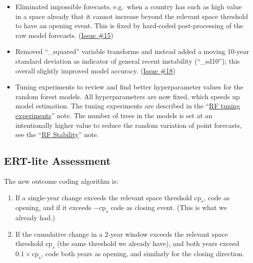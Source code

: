 \documentclass[
  11pt,
]{article}
\providecommand{\tightlist}{%
  \setlength{\itemsep}{0pt}\setlength{\parskip}{0pt}}
\begin{document}
\begin{itemize}
\tightlist
\item
  Eliminated impossible forecasts, e.g.~when a country has such as high
  value in a space already that it cannot increase beyond the relevant
  space threshold to have an opening event. This is fixed by hard-coded
  post-processing of the raw model forecasts.
  (\href{https://github.com/vdeminstitute/demspaces/issues/15}{Issue
  \#15})
\item
  Removed ``\_squared'' variable transforms and instead added a moving
  10-year standard deviation as indicator of general recent instability
  (``\_sd10''); this overall slightly improved model accuracy.
  (\href{https://github.com/vdeminstitute/demspaces/issues/18}{Issue
  \#18})
\item
  Tuning experiments to review and find better hyperparameter values for
  the random forest models. All hyperparameters are now fixed, which
  speeds up model estimation. The tuning experiments are described in
  the
  ``\href{https://github.com/vdeminstitute/demspaces/blob/main/2022-update/tuning-experiments.md}{RF
  tuning experiments}'' note. The number of trees in the models is set
  at an intentionally higher value to reduce the random variation of
  point forecasts, see the
  ``\href{https://github.com/vdeminstitute/demspaces/blob/main/2022-update/rf-stability.md}{RF
  Stability}'' note.
\end{itemize}

\hypertarget{ert-lite-assessment}{%
\subsection{ERT-lite Assessment}\label{ert-lite-assessment}}

The new outcome coding algorithm is:

\begin{enumerate}
\def\labelenumi{\arabic{enumi}.}
\tightlist
\item
  If a single-year change exceeds the relevant space threshold
  \(\textrm{cp}_s\), code as opening, and if it exceeds
  \(-\textrm{cp}_s\) code as closing event. (This is what we already
  had.)
\item
  If the cumulative change in a 2-year window exceeds the relevant space
  threshold \(\textrm{cp}_s\) (the same threshold we already have), and
  both years exceed \(0.1 \times \textrm{cp}_s\), code both years as
  opening, and similarly for the closing direction.
\end{enumerate}
\end{document}
